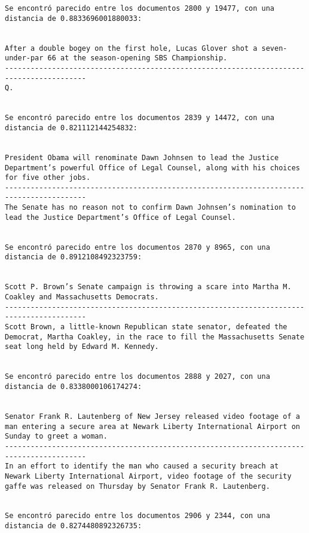 \documentclass[11pt]{article}
\begin{document}
\begin{Verbatim}[commandchars=\\\{\}]
Se encontró parecido entre los documentos 2800 y 19477, con una distancia de 0.8833696001880033:


After a double bogey on the first hole, Lucas Glover shot a seven-under-par 66 at the season-opening SBS Championship.
-----------------------------------------------------------------------------------------
Q.


Se encontró parecido entre los documentos 2839 y 14472, con una distancia de 0.821112144254832:


President Obama will renominate Dawn Johnsen to lead the Justice Department’s powerful Office of Legal Counsel, along with his choices for five other jobs.
-----------------------------------------------------------------------------------------
The Senate has no reason not to confirm Dawn Johnsen’s nomination to lead the Justice Department’s Office of Legal Counsel.


Se encontró parecido entre los documentos 2870 y 8965, con una distancia de 0.8912108492323759:


Scott P. Brown’s Senate campaign is throwing a scare into Martha M. Coakley and Massachusetts Democrats.
-----------------------------------------------------------------------------------------
Scott Brown, a little-known Republican state senator, defeated the Democrat, Martha Coakley, in the race to fill the Massachusetts Senate seat long held by Edward M. Kennedy.


Se encontró parecido entre los documentos 2888 y 2027, con una distancia de 0.8338000106174274:


Senator Frank R. Lautenberg of New Jersey released video footage of a man entering a secure area at Newark Liberty International Airport on Sunday to greet a woman.
-----------------------------------------------------------------------------------------
In an effort to identify the man who caused a security breach at Newark Liberty International Airport, video footage of the security gaffe was released on Thursday by Senator Frank R. Lautenberg.


Se encontró parecido entre los documentos 2906 y 2344, con una distancia de 0.8274480892326735:



\end{Verbatim}
\end{document}
